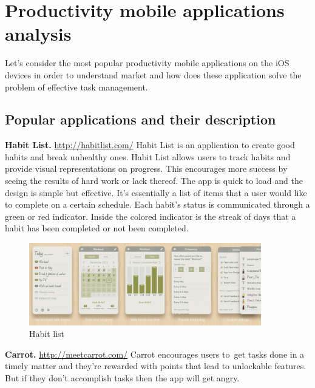 \chapter{Productivity mobile applications analysis}
\label{chap:apps}
Let's consider the most popular productivity mobile applications on the iOS devices in order to understand market and how does these application solve the problem of effective task management.

\section{Popular applications and their description}

\textbf{Habit List.} \url{http://habitlist.com/} Habit List is an application to create good habits and break unhealthy ones. Habit List allows users to track habits and provide visual representations on progress. This encourages more success by seeing the results of hard work or lack thereof. The app is quick to load and the design is simple but effective. It’s essentially a list of items that a user would like to complete on a certain schedule. Each habit’s status is communicated through a green or red indicator. Inside the colored indicator is the streak of days that a habit has been completed or not been completed.

\begin{figure}
   \centering
	\includegraphics[width=0.9\textwidth]{resources/habit-list.pdf}
	\caption[Habit List]{Habit list}
\end{figure}


\textbf{Carrot.} \url{http://meetcarrot.com/} Carrot encourages users to get tasks done in a timely matter and they're rewarded with points that lead to unlockable features. But if they don't accomplish tasks then the app will get angry.

